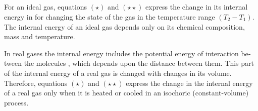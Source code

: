 \subsection{}\label{9.5.5} For an ideal gas, equations $(\star)$ and $(\star\star)$ express the change in its internal energy in  for changing the state of the gas in the temperature range $(T_{2} - T_{1})$. The internal energy of an ideal gas depends only on its chemical composition, mass and temperature.

In real gases  the inter­nal energy includes the poten­tial energy of interaction be­tween the molecules , which depends upon the dis­tance between them. This part of the internal energy of a real gas is changed with changes in its volume. Therefore, equations $(\star)$ and $(\star\star)$ express the change in the internal energy of a real gas only when it is heated or cooled in an isochoric (constant-volume) process.

